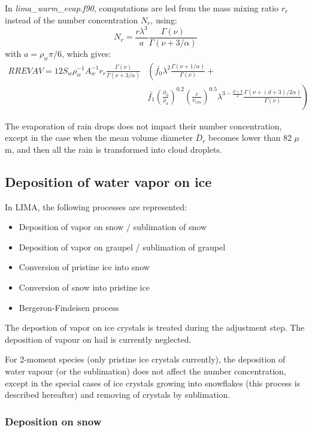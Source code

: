 In \emph{lima\_warm\_evap.f90}, computations are led from the mass mixing ratio $r_r$ instead of the number concentration $N_r$, using:
\begin{equation}
 N_r = \frac{r \lambda^3}{a} \frac{\Gamma(\nu)}{\Gamma(\nu+3/\alpha)}
\end{equation}
with $a=\rho_w \pi / 6$, which gives:
\begin{align}
 RREVAV = 12 S_w \rho_w^{-1} A_w^{-1} r_r \frac{\Gamma(\nu)}{\Gamma(\nu+3/\alpha)} & \left( \bar{f_0} \lambda^2 \frac{\Gamma(\nu + 1 / \alpha)}{\Gamma(\nu)} + \right. \nonumber \\
 &\left. \bar{f_1} \left(\frac{\rho_0}{\rho_a}\right)^{0.2} \left(\frac{c}{\nu_{cin}}\right)^{0.5} \lambda^{3-\frac{d+3}{2}} \frac{\Gamma(\nu + (d+3)/2\alpha)}{\Gamma(\nu)} \right)
\end{align}

The evaporation of rain drops does not impact their number concentration, except in the case when the mean volume diameter $\bar{D}_r$ becomes lower than 82 $\mu$m, and then all the rain is transformed into cloud droplets.

\subsection{Deposition of water vapor on ice}

In LIMA, the following processes are represented:
\begin{itemize}
 \item Deposition of vapor on snow / sublimation of snow
 \item Deposition of vapor on graupel / sublimation of graupel
 \item Conversion of pristine ice into snow
 \item Conversion of snow into pristine ice
 \item Bergeron-Findeisen process
\end{itemize}
The depostion of vapor on ice crystals is treated during the adjustment step. The deposition of vapour on hail is currently neglected.

For 2-moment species (only pristine ice crystals currently), the deposition of water vapour (or the sublimation) does not affect the number concentration, except in the special cases of ice crystals growing into snowflakes (this process is described hereafter) and removing of crystals by sublimation.

\subsubsection{Deposition on snow}

